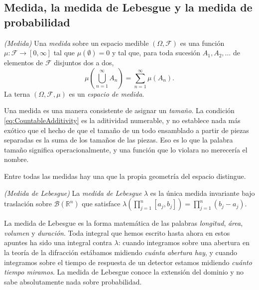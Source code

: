 	\subsection{Medida, la medida de Lebesgue y la medida de probabilidad}

		\begin{myDef}
			\textit{(Medida)} Una \textit{medida} sobre un espacio medible $(\Omega,\mathcal{F})$ es una función $\mu:\mathcal{F}\to[0,\infty]$ tal que $\mu(\emptyset)=0$ y tal que, para toda sucesión $A_{1},A_{2},\dots$ de elementos de $\mathcal{F}$ disjuntos dos a dos,
			\begin{equation}\label{eq:CountableAdditivity}
				\mu\left(\bigcup_{n=1}^{\infty}A_{n}\right) = \sum_{n=1}^{\infty}\mu(A_{n}).
			\end{equation}
			La terna $(\Omega,\mathcal{F},\mu)$ es un \textit{espacio de medida}.
		\end{myDef}

		Una medida es una manera consistente de asignar un \textit{tamaño}. La condición \eqref{eq:CountableAdditivity} es la aditividad numerable, y no establece nada más exótico que el hecho de que el tamaño de un todo ensamblado a partir de piezas separadas es la suma de los tamaños de las piezas. Eso es lo que la palabra tamaño significa operacionalmente, y una función que lo violara no merecería el nombre.

		Entre todas las medidas hay una que la propia geometría del espacio distingue.

		\begin{myDef}
			\textit{(Medida de Lebesgue)} La \textit{medida de Lebesgue} $\lambda$ es la única medida invariante bajo traslación sobre $\mathcal{B}(\mathbb{R}^{n})$ que satisface $\lambda\left(\prod_{j=1}^{n}[a_{j},b_{j}]\right) = \prod_{j=1}^{n}(b_{j}-a_{j})$.
		\end{myDef}

		La medida de Lebesgue \citep{lebesgue1902integrale} es la forma matemática de las palabras \textit{longitud}, \textit{área}, \textit{volumen} y \textit{duración}. Toda integral que hemos escrito hasta ahora en estos apuntes ha sido una integral contra $\lambda$: cuando integramos sobre una abertura en la teoría de la difracción estábamos midiendo \textit{cuánta abertura hay}, y cuando integramos sobre el tiempo de respuesta de un detector estamos midiendo \textit{cuánto tiempo miramos}. La medida de Lebesgue conoce la extensión del dominio y no sabe absolutamente nada sobre probabilidad.

